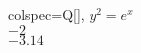 \begin{table}
\centering
\begin{tblr}[         %
]                     %
{                     %
colspec={Q[]},
}                     %
\toprule
$y^2 = e^x$ \\ \midrule %
$-2   $ \\
$-3.14$ \\
\bottomrule
\end{tblr}
\end{table} 
